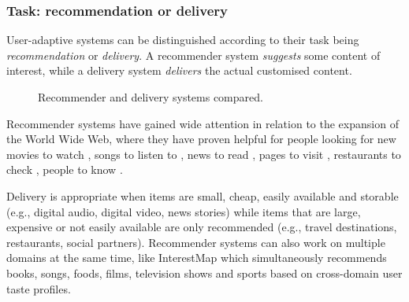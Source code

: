 
\subsubsection{Task: recommendation or delivery} %
\label{ssub:to_recommend_or_to_deliver}

User-adaptive systems can be distinguished according to their task being \emph{recommendation} or \emph{delivery}. A recommender system \emph{suggests} some content of interest,
while a delivery system \emph{delivers} the actual customised content. %
\begin{figure}[bthp]
\centering \setlength{\abovecaptionskip}{3pt}
\caption{Recommender and delivery systems compared.}
\label{fig:recommend_deliver}
\end{figure}

Recommender systems have gained wide attention in relation to the expansion of the World Wide Web, where they have proven helpful for people looking for new movies to watch \cite{Hill95}, songs to listen to \cite{Shardanand94}, news to read \cite{Resnick94}, pages to visit \cite{Lieberman95}, restaurants to check \cite{McCarthy02}, people to know \cite{Terveen05}. %

Delivery is appropriate when items are small, cheap, easily available and storable (e.g., digital audio, digital video, news stories) while items that are large, expensive or not easily available are only recommended (e.g., travel destinations, restaurants, social partners).
Recommender systems can also work on multiple domains at the same time, like InterestMap \cite{Liu05} which simultaneously recommends books, songs, foods, films, television shows and sports based on cross-domain user taste profiles.

